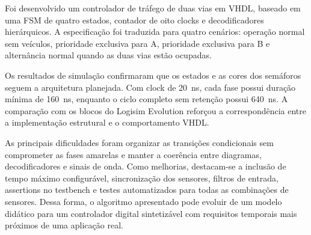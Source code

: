 \documentclass[conference]{IEEEtran}
\begin{document}
Foi desenvolvido um controlador de tráfego de duas vias em VHDL, baseado em
uma FSM de quatro estados, contador de oito clocks e decodificadores
hierárquicos. A especificação foi traduzida para quatro cenários: operação
normal sem veículos, prioridade exclusiva para A, prioridade exclusiva para
B e alternância normal quando as duas vias estão ocupadas.

Os resultados de simulação confirmaram que os estados e as cores dos
semáforos seguem a arquitetura planejada. Com clock de 20~ns, cada fase
possui duração mínima de 160~ns, enquanto o ciclo completo sem retenção
possui 640~ns. A comparação com os blocos do Logisim Evolution reforçou a
correspondência entre a implementação estrutural e o comportamento VHDL.

As principais dificuldades foram organizar as transições condicionais sem
comprometer as fases amarelas e manter a coerência entre diagramas,
decodificadores e sinais de onda. Como melhorias, destacam-se a inclusão de
tempo máximo configurável, sincronização dos sensores, filtros de entrada,
assertions no testbench e testes automatizados para todas as combinações de
sensores. Dessa forma, o algoritmo apresentado pode evoluir de um modelo
didático para um controlador digital sintetizável com requisitos temporais
mais próximos de uma aplicação real.
\end{document}
